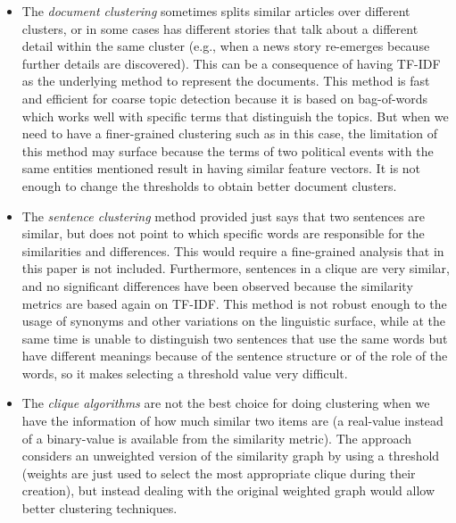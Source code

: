 \begin{itemize}
    \item The \emph{document clustering} sometimes splits similar articles over different clusters, or in some cases has different stories that talk about a different detail within the same cluster (e.g., when a news story re-emerges because further details are discovered).
    This can be a consequence of having TF-IDF as the underlying method to represent the documents.
    This method is fast and efficient for coarse topic detection because it is based on bag-of-words which works well with specific terms that distinguish the topics.
    But when we need to have a finer-grained clustering such as in this case, the limitation of this method may surface because the terms of two political events with the same entities mentioned result in having similar feature vectors.
    It is not enough to change the thresholds to obtain better document clusters.
    \item The \emph{sentence clustering} method provided just says that two sentences are similar, but does not point to which specific words are responsible for the similarities and differences. This would require a fine-grained analysis that in this paper is not included. Furthermore, sentences in a clique are very similar, and no significant differences have been observed because the similarity metrics are based again on TF-IDF. This method is not robust enough to the usage of synonyms and other variations on the linguistic surface, while at the same time is unable to distinguish two sentences that use the same words but have different meanings because of the sentence structure or of the role of the words, so it makes selecting a threshold value very difficult.
    \item The \emph{clique algorithms} are not the best choice for doing clustering when we have the information of how much similar two items are (a real-value instead of a binary-value is available from the similarity metric). The approach considers an unweighted version of the similarity graph by using a threshold (weights are just used to select the most appropriate clique during their creation), but instead dealing with the original weighted graph would allow better clustering techniques. %
\end{itemize}


